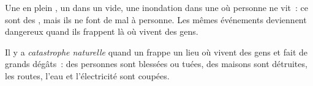 Une  en plein , un  dans un  vide, une inondation
dans une  où personne ne vit~: ce sont des , mais ils
ne font de mal à personne. Les mêmes événements deviennent dangereux quand
ils frappent là où vivent des gens.

\begin{definition}\label{def:g5:natural-hazards:disaster}
Il y a \emph{catastrophe naturelle} quand un
 frappe un lieu où vivent des gens et fait de grands dégâts~:
des personnes sont blessées ou tuées, des maisons sont détruites, les
routes, l'eau et l'électricité sont coupées.
\end{definition}

